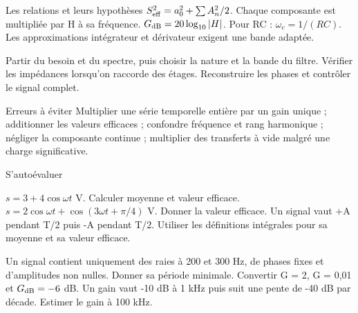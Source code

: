 \begin{loi}{Les relations et leurs hypothèses}
$S_{\rm eff}^2=a_0^2+\sum A_n^2/2$. Chaque composante est multipliée par H à sa fréquence. $G_{\rm dB}=20\log_{10}|H|$. Pour RC : $\omega_c=1/(RC)$. Les approximations intégrateur et dérivateur exigent une bande adaptée.
\end{loi}
Partir du besoin et du spectre, puis choisir la nature et la bande du filtre. Vérifier les impédances lorsqu’on raccorde des étages. Reconstruire les phases et contrôler le signal complet.
\begin{piege}{Erreurs à éviter}
Multiplier une série temporelle entière par un gain unique ; additionner les valeurs efficaces ; confondre fréquence et rang harmonique ; négliger la composante continue ; multiplier des transferts à vide malgré une charge significative.
\end{piege}
\begin{docu}{S’autoévaluer}
\end{docu}


$s=3+4\cos\omega t$ V. Calculer moyenne et valeur efficace.
$s=2\cos\omega t+\cos(3\omega t+\pi/4)$ V. Donner la valeur efficace.
Un signal vaut +A pendant T/2 puis -A pendant T/2. Utiliser les définitions intégrales pour sa moyenne et sa valeur efficace.


Un signal contient uniquement des raies à 200 et 300 Hz, de phases fixes et d’amplitudes non nulles. Donner sa période minimale.
Convertir G = 2, G = 0,01 et $G_{\rm dB}=-6$ dB.
Un gain vaut -10 dB à 1 kHz puis suit une pente de -40 dB par décade. Estimer le gain à 100 kHz.


